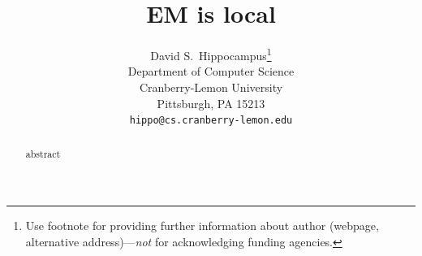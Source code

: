 \documentclass{article}
\title{EM is local}
\author{%
  David S.~Hippocampus\thanks{Use footnote for providing further information
    about author (webpage, alternative address)---\emph{not} for acknowledging
    funding agencies.} \\
  Department of Computer Science\\
  Cranberry-Lemon University\\
  Pittsburgh, PA 15213 \\
  \texttt{hippo@cs.cranberry-lemon.edu} \\
}
\begin{document}
\maketitle


\begin{abstract}
  abstract
\end{abstract}







\clearpage

\newpage

\end{document}
